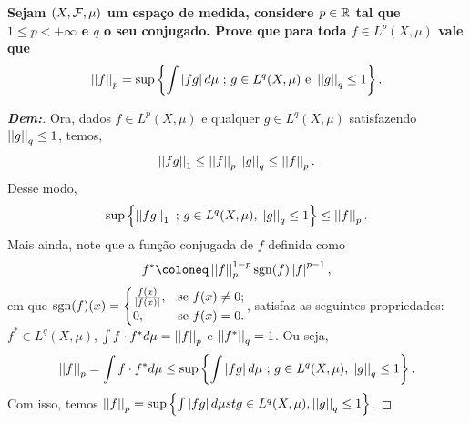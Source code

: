 \textbf{Sejam $(X, \mcal F, \mu)$ um espaço de medida, considere 
$p \in \bR$ tal que $1 \le p < +\infty$ e $q$ o seu conjugado. Prove que para 
toda $f \in L^p(X, \mu)$ vale que 
\begin{align*}
  \pnorm p f = \sup \set{\int \mparth{fg} d\mu \st g\in L^q(X, \mu) \text{ e } 
  \pnorm q g \le 1}.
\end{align*}}
\begin{proof}[\textbf{Dem:}] Ora, dados 
  $f \in L^p(X, \mu)$ e qualquer $g \in L^q(X, \mu)$ satisfazendo $\pnorm q g \le 1$,
  temos, 
  \begin{align*}
    \pnorm 1 {fg} \le \pnorm p f \pnorm q g \le \pnorm p f.
  \end{align*}
  Desse modo, 
  \begin{align*}
    \sup\set{\pnorm 1 {fg} \st g\in L^q(X, \mu), \pnorm q g \le 1} \le \pnorm p f.
  \end{align*}
  Mais ainda, note que a função conjugada de $f$ definida como 
  \begin{align*}
    f^* \coloneq \pnorm p f^{1-p} \sgn(f)\mparth{f}^{p-1},
  \end{align*}
  em que $\sgn(f)(x) = \begin{cases}
    \frac{f(x)}{\mparth{f(x)}}, & \text{se } f(x) \neq 0;\\
    0, &\text{se } f(x) = 0.
  \end{cases}$, satisfaz as seguintes propriedades: $f^* \in L^q(X, \mu)$, 
  $\int f\cdot f^* d\mu = \pnorm p f$ e $\pnorm q {f^*} = 1$. Ou seja, 
  \begin{align*}
    \pnorm p f = \int f\cdot f^* d\mu \le \sup \set{\int \mparth{fg}d\mu \st 
    g \in L^q(X, \mu), \pnorm q g \le 1}.
  \end{align*}
  Com isso, temos $\pnorm p f = \sup\set{\int \mparth{fg} d\mu st g \in L^q(X, \mu), 
  \pnorm q g \le 1}$.
\end{proof}

